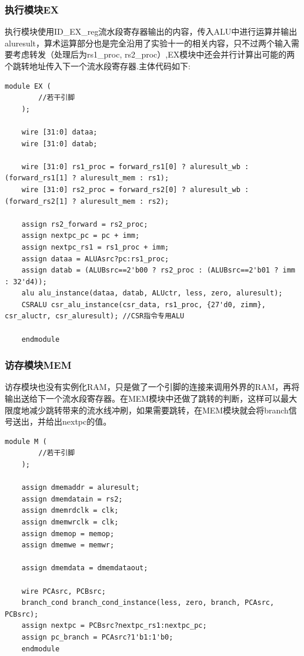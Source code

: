 \documentclass[]{article}
\begin{document}
  \subsubsection{执行模块EX}
  执行模块使用ID\_EX\_reg流水段寄存器输出的内容，传入ALU中进行运算并输出aluresult，算术运算部分也是完全沿用了实验十一的相关内容，只不过两个输入需要考虑转发（处理后为rs1\_proc, rs2\_proc）,EX模块中还会并行计算出可能的两个跳转地址传入下一个流水段寄存器.主体代码如下:
  \begin{lstlisting}[style={verilog-style}]
    module EX (
        //若干引脚
    );
    
    wire [31:0] dataa;
    wire [31:0] datab;
    
    wire [31:0] rs1_proc = forward_rs1[0] ? aluresult_wb : (forward_rs1[1] ? aluresult_mem : rs1);
    wire [31:0] rs2_proc = forward_rs2[0] ? aluresult_wb : (forward_rs2[1] ? aluresult_mem : rs2);
    
    assign rs2_forward = rs2_proc;
    assign nextpc_pc = pc + imm;
    assign nextpc_rs1 = rs1_proc + imm;
    assign dataa = ALUAsrc?pc:rs1_proc;
    assign datab = (ALUBsrc==2'b00 ? rs2_proc : (ALUBsrc==2'b01 ? imm : 32'd4));
    alu alu_instance(dataa, datab, ALUctr, less, zero, aluresult);
    CSRALU csr_alu_instance(csr_data, rs1_proc, {27'd0, zimm}, csr_aluctr, csr_aluresult); //CSR指令专用ALU
        
    endmodule
  \end{lstlisting}  
  \subsubsection{访存模块MEM}
  访存模块也没有实例化RAM，只是做了一个引脚的连接来调用外界的RAM，再将输出送给下一个流水段寄存器。在MEM模块中还做了跳转的判断，这样可以最大限度地减少跳转带来的流水线冲刷，如果需要跳转，在MEM模块就会将branch信号送出，并给出nextpc的值。
  \begin{lstlisting}[style={verilog-style}]
    module M (
        //若干引脚
    );
    
    assign dmemaddr = aluresult;
    assign dmemdatain = rs2;
    assign dmemrdclk = clk;
    assign dmemwrclk = clk;
    assign dmemop = memop;
    assign dmemwe = memwr;
    
    assign dmemdata = dmemdataout;
    
    wire PCAsrc, PCBsrc;
    branch_cond branch_cond_instance(less, zero, branch, PCAsrc, PCBsrc);
    assign nextpc = PCBsrc?nextpc_rs1:nextpc_pc;
    assign pc_branch = PCAsrc?1'b1:1'b0;
    endmodule
  \end{lstlisting}    
\end{document}
